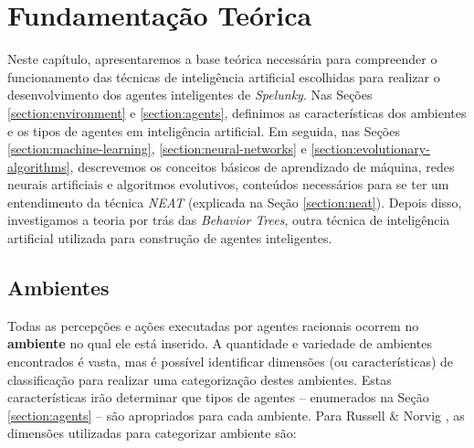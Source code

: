 \chapter{\label{chap:theory}Fundamentação Teórica}
Neste capítulo, apresentaremos a base teórica necessária para compreender o
funcionamento das técnicas de inteligência artificial escolhidas para realizar o
desenvolvimento dos agentes inteligentes de \textit{Spelunky}. Nas Seções
\ref{section:environment} e \ref{section:agents}, definimos as características
dos ambientes e os tipos de agentes em inteligência artificial. Em seguida, nas
Seções \ref{section:machine-learning}, \ref{section:neural-networks} e
\ref{section:evolutionary-algorithms}, descrevemos os conceitos básicos de
aprendizado de máquina, redes neurais artificiais e algoritmos evolutivos,
conteúdos necessários para se ter um entendimento da técnica \textit{NEAT}
(explicada na Seção \ref{section:neat}). Depois disso, investigamos a teoria por
trás das \textit{Behavior Trees}, outra técnica de inteligência artificial
utilizada para construção de agentes inteligentes.


\section{\label{section:environment}Ambientes}
Todas as percepções e ações executadas por agentes racionais ocorrem no
\textbf{ambiente} no qual ele está inserido. A quantidade e variedade de
ambientes encontrados é vasta, mas é possível identificar dimensões (ou
características) de classificação para realizar uma categorização destes
ambientes. Estas características irão determinar que tipos de agentes --
enumerados na Seção \ref{section:agents} -- são apropriados para cada ambiente.
Para Russell \& Norvig \cite{RussellNorvig200912}, as dimensões utilizadas para
categorizar ambiente são:

